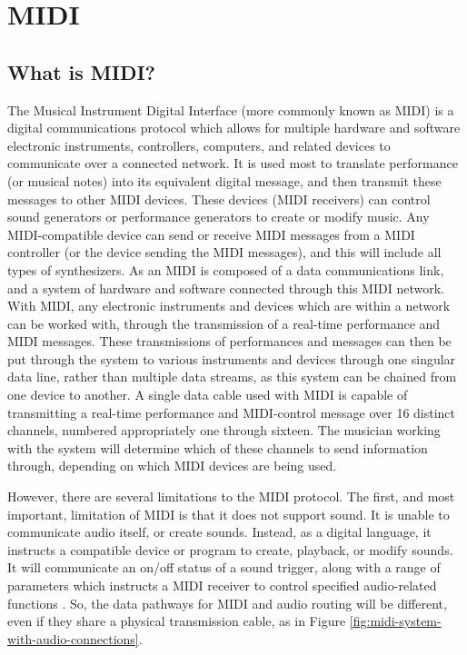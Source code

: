 \section[MIDI: An Introduction]{MIDI}\label{section:midi}

\subsection[What is MIDI?]{What is MIDI?}\label{section:what-midi}
The Musical Instrument Digital Interface (more commonly known as MIDI) is a digital communications protocol which allows for multiple hardware and software electronic instruments, controllers, computers, and related devices to communicate over a connected network\cite{Huber_2012}. It is used most to translate performance  (or musical notes) into its equivalent digital message, and then transmit these messages to other MIDI devices. These devices (MIDI receivers) can control sound generators or performance generators to create or modify music. Any MIDI-compatible device can send or receive MIDI messages from a MIDI controller (or the device sending the MIDI messages), and this will include all types of synthesizers. As an  MIDI is composed of a data communications link, and a system of hardware and software connected through this MIDI network. With MIDI, any electronic instruments and devices which are within a network can be worked with, through the transmission of a real-time performance and MIDI messages. These transmissions of performances and messages can then be put through the system to various instruments and devices through one singular data line, rather than multiple data streams, as this system can be chained from one device to another. A single data cable used with MIDI is capable of transmitting a real-time performance and MIDI-control message over 16 distinct channels, numbered appropriately one through sixteen. The musician working with the system will determine which of these channels to send information through, depending on which MIDI devices are being used\cite{Romano_2003}.

However, there are several limitations to the MIDI protocol. The first, and most important, limitation of MIDI is that it does not support sound. It is unable to communicate audio itself, or create sounds\cite{Huber_2012}. Instead, as a digital language, it instructs a compatible device or program to create, playback, or modify sounds. It will communicate an on/off status of a sound trigger, along with a range of parameters which instructs a MIDI receiver to control specified audio-related functions \cite{Kirk_Hunt_2013}. So, the data pathways for MIDI and audio routing will be different, even if they share a physical transmission cable, as in Figure \ref{fig:midi-system-with-audio-connections}\cite{Huber_2012}. 


